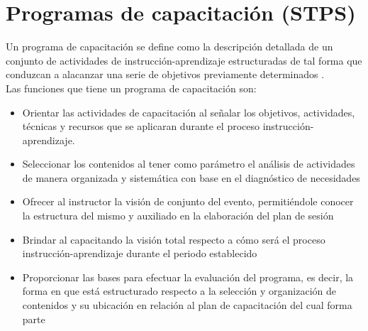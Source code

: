 \section{Programas de capacitación (STPS)}
Un programa de capacitación se define como la descripción detallada de un conjunto de actividades de instrucción-aprendizaje estructuradas de tal forma que conduzcan a alacanzar una serie de objetivos previamente determinados \cite{STPS-PC}.
\\
Las funciones que tiene un programa de capacitación son:
\begin{itemize}
  \item Orientar las actividades de capacitación al señalar los objetivos, actividades, técnicas y recursos que se aplicaran durante el proceso instrucción-aprendizaje.
  \item Seleccionar los contenidos al tener como parámetro el análisis de actividades de manera organizada y sistemática con base en el diagnóstico de necesidades
  \item Ofrecer al instructor la visión de conjunto del evento, permitiéndole conocer la estructura del mismo y auxiliado en la elaboración del plan de sesión
  \item Brindar al capacitando la visión total respecto a cómo será el proceso instrucción-aprendizaje durante el periodo establecido
  \item Proporcionar las bases para efectuar la evaluación del programa, es decir, la forma en que está estructurado respecto a la selección y organización de contenidos y su ubicación en relación al plan de capacitación del cual forma parte 
\end{itemize}
